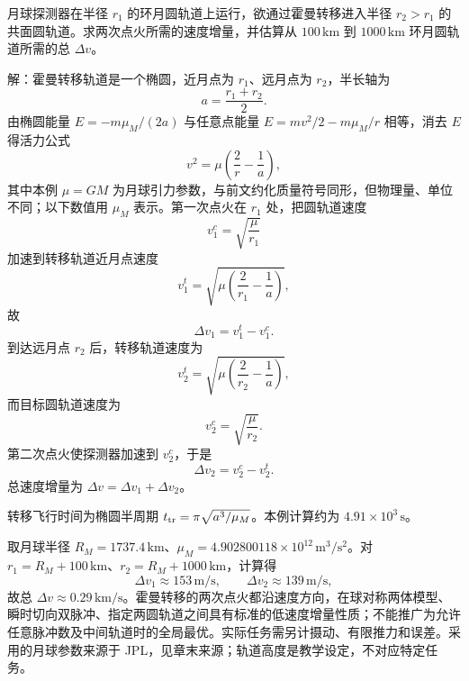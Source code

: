 \begin{example}[月球探测器的霍曼转移]
月球探测器在半径 $r_1$ 的环月圆轨道上运行，欲通过霍曼转移进入半径 $r_2>r_1$ 的共面圆轨道。求两次点火所需的速度增量，并估算从 $100\,\mathrm{km}$ 到 $1000\,\mathrm{km}$ 环月圆轨道所需的总 $\Delta v$。

\begin{center}
\end{center}

解：霍曼转移轨道是一个椭圆，近月点为 $r_1$、远月点为 $r_2$，半长轴为
\[
a=\frac{r_1+r_2}{2}.
\]
由椭圆能量 $E=-m\mu_M/(2a)$ 与任意点能量 $E=mv^2/2-m\mu_M/r$ 相等，消去 $E$ 得活力公式
\[
v^2=\mu\left(\frac{2}{r}-\frac{1}{a}\right),
\]
其中本例 $\mu=GM$ 为月球引力参数，与前文约化质量符号同形，但物理量、单位不同；以下数值用 $\mu_M$ 表示。第一次点火在 $r_1$ 处，把圆轨道速度
\[
v_1^c=\sqrt{\frac{\mu}{r_1}}
\]
加速到转移轨道近月点速度
\[
v_1^t=\sqrt{\mu\left(\frac{2}{r_1}-\frac{1}{a}\right)},
\]
故
\[
\Delta v_1=v_1^t-v_1^c .
\]
到达远月点 $r_2$ 后，转移轨道速度为
\[
v_2^t=\sqrt{\mu\left(\frac{2}{r_2}-\frac{1}{a}\right)},
\]
而目标圆轨道速度为
\[
v_2^c=\sqrt{\frac{\mu}{r_2}}.
\]
第二次点火使探测器加速到 $v_2^c$，于是
\[
\Delta v_2=v_2^c-v_2^t .
\]
总速度增量为 $\Delta v=\Delta v_1+\Delta v_2$。

转移飞行时间为椭圆半周期 $t_{\rm tr}=\pi\sqrt{a^3/\mu_M}$。本例计算约为 $4.91\times10^3\,\mathrm{s}$。

取月球半径 $R_M=1737.4\,\mathrm{km}$、$\mu_M=4.902800118\times10^{12}\,\mathrm{m^3/s^2}$。对 $r_1=R_M+100\,\mathrm{km}$、$r_2=R_M+1000\,\mathrm{km}$，计算得
\[
\Delta v_1\approx153\,\mathrm{m/s},\qquad
\Delta v_2\approx139\,\mathrm{m/s},
\]
故总 $\Delta v\approx0.29\,\mathrm{km/s}$。霍曼转移的两次点火都沿速度方向，在球对称两体模型、瞬时切向双脉冲、指定两圆轨道之间具有标准的低速度增量性质；不能推广为允许任意脉冲数及中间轨道时的全局最优。实际任务需另计摄动、有限推力和误差。采用的月球参数来源于 JPL，见章末来源；轨道高度是教学设定，不对应特定任务。
\end{example}

